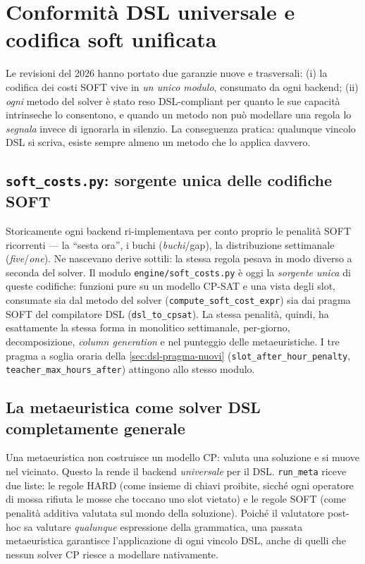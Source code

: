 \section{Conformit\`a DSL universale e codifica soft unificata}
\label{sec:dsl-universale}

\begin{novitabox}
Le revisioni del 2026 hanno portato due garanzie nuove e trasversali:
(i) la codifica dei costi SOFT vive in \emph{un unico modulo}, consumato
da ogni backend; (ii) \emph{ogni} metodo del solver \`e stato reso DSL-com\-pliant
per quanto le sue capacit\`a intrinseche lo consentono, e quando un metodo
non pu\`o modellare una regola lo \emph{segnala} invece di ignorarla in
silenzio. La conseguenza pratica: qualunque vincolo DSL si scriva, esiste
sempre almeno un metodo che lo applica davvero.
\end{novitabox}

\subsection{\texttt{soft\_costs.py}: sorgente unica delle codifiche SOFT}
\label{sec:dsl-soft-costs-single}

Storicamente ogni backend ri-implementava per conto proprio le penalit\`a
SOFT ricorrenti --- la ``sesta ora'', i buchi (\emph{buchi}/gap), la
distribuzione settimanale (\emph{five}/\emph{one}). Ne nascevano derive
sottili: la stessa regola pesava in modo diverso a seconda del solver.
Il modulo \texttt{engine/soft\_costs.py} \`e oggi la \emph{sorgente unica}
di queste codifiche: funzioni pure su un modello CP-SAT e una vista degli
slot, consumate sia dal metodo del solver (\texttt{compute\_soft\_cost\_expr})
sia dai pragma SOFT del compilatore DSL (\texttt{dsl\_to\_cpsat}). La stessa
penalit\`a, quindi, ha esattamente la stessa forma in monolitico
settimanale, per-giorno, decomposizione, \emph{column generation} e nel
punteggio delle metaeuristiche. I tre pragma a soglia oraria della
\cref{sec:dsl-pragma-nuovi} (\texttt{slot\_after\_hour\_penalty},
\texttt{teacher\_max\_hours\_after}) attingono allo stesso modulo.

\subsection{La metaeuristica come solver DSL completamente generale}
\label{sec:dsl-meta-universale}

Una metaeuristica non costruisce un modello CP: valuta una soluzione e
si muove nel vicinato. Questo la rende il backend \emph{universale} per il
DSL. \texttt{run\_meta} riceve due liste: le regole HARD (come insieme di
chiavi proibite, sicch\'e ogni operatore di mossa rifiuta le mosse che
toccano uno slot vietato) e le regole SOFT (come penalit\`a additiva
valutata sul mondo della soluzione). Poich\'e il valutatore post-hoc sa
valutare \emph{qualunque} espressione della grammatica, una passata
metaeuristica garantisce l'applicazione di ogni vincolo DSL, anche di
quelli che nessun solver CP riesce a modellare nativamente.

